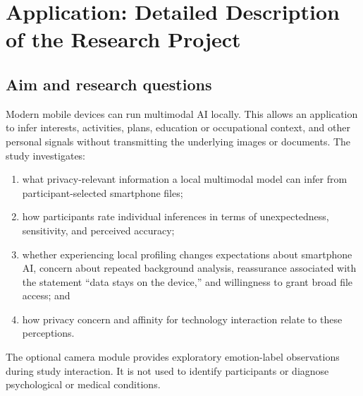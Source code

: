 \documentclass[10pt,a4paper]{article}
\begin{document}
\newpage
\section*{Application: Detailed Description of the Research Project}

\subsection*{Aim and research questions}
Modern mobile devices can run multimodal AI locally. This allows an application to infer interests, activities, plans, education or occupational context, and other personal signals without transmitting the underlying images or documents. The study investigates:
\begin{enumerate}
  \item what privacy-relevant information a local multimodal model can infer from participant-selected smartphone files;
  \item how participants rate individual inferences in terms of unexpectedness, sensitivity, and perceived accuracy;
  \item whether experiencing local profiling changes expectations about smartphone AI, concern about repeated background analysis, reassurance associated with the statement ``data stays on the device,'' and willingness to grant broad file access; and
  \item how privacy concern and affinity for technology interaction relate to these perceptions.
\end{enumerate}

The optional camera module provides exploratory emotion-label observations during study interaction. It is not used to identify participants or diagnose psychological or medical conditions.
\end{document}
